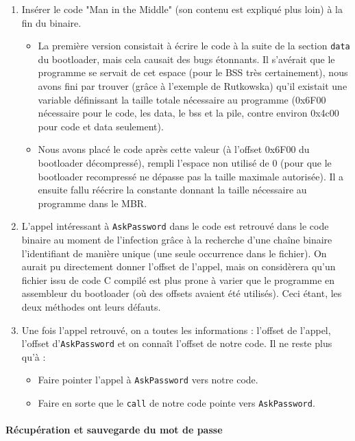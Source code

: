 \documentclass[12pt,a4paper]{article}
\begin{document}
\begin{enumerate}
    \item Insérer le code "Man in the Middle" (son contenu est expliqué plus loin)
    à la fin du binaire.
    \begin{itemize}
        \item La première version consistait à écrire le code à la suite de la
        section \texttt{data} du bootloader, mais cela causait des bugs étonnants.
        Il s'avérait que le programme se servait de cet espace (pour le BSS très
        certainement), nous avons fini par trouver (grâce à l'exemple de
        Rutkowska) qu'il existait une variable définissant la taille totale
        nécessaire au programme (0x6F00 nécessaire pour le code, les
        data, le bss et la pile, contre environ 0x4c00 pour code et data
        seulement).
        \item Nous avons placé le code après cette valeur (à l'offset 0x6F00 du
        bootloader décompressé), rempli l'espace non utilisé de 0 (pour que le
        bootloader recompressé ne dépasse pas la taille maximale autorisée). Il
        a ensuite fallu réécrire la constante donnant la taille nécessaire au 
        programme dans le MBR.
    \end{itemize}
    \item L'appel intéressant à \texttt{AskPassword} dans le code est retrouvé
    dans le code binaire au moment de l'infection grâce à la recherche d'une
    chaîne binaire l'identifiant de manière unique (une seule occurrence dans
    le fichier). On aurait pu directement donner l'offset de l'appel, mais on
    considèrera qu'un fichier issu de code C compilé est plus prone à varier
    que le programme en assembleur du bootloader (où des offsets avaient été
    utilisés). Ceci étant, les deux méthodes ont leurs défauts.
    \item Une fois l'appel retrouvé, on a toutes les informations : l'offset de
    l'appel, l'offset d'\texttt{AskPassword} et on connaît l'offset de notre code.
    Il ne reste plus qu'à :
    \begin{itemize}
        \item Faire pointer l'appel à \texttt{AskPassword} vers notre code.
        \item Faire en sorte que le \texttt{call} de notre code pointe vers
        \texttt{AskPassword}.
    \end{itemize}
\end{enumerate}

\paragraph{Récupération et sauvegarde du mot de passe}~
\end{document}
